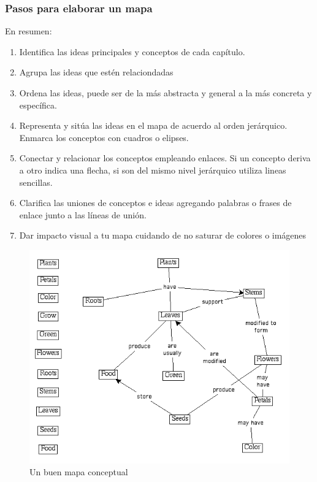 \documentclass[
	11pt, %
]{beamer}
\begin{document}
\begin{frame}
  \frametitle{Pasos para elaborar un mapa}

  En resumen:\\
  \begin{enumerate}
  \item Identifica las ideas principales y conceptos de cada capítulo.
  \item Agrupa las ideas que estén relaciondadas
  \item Ordena las ideas, puede ser de la más abstracta y general a la más concreta y específica.
  \item Representa y sitúa las ideas en el mapa de acuerdo al orden jerárquico. Enmarca los conceptos con cuadros o elipses.
  \item Conectar y relacionar los conceptos empleando enlaces. Si un concepto deriva a otro indica una flecha, si son del mismo nivel jerárquico utiliza lineas sencillas.
  \item Clarifica las uniones de conceptos e ideas agregando palabras o frases de enlace junto a las líneas de unión.
  \item Dar impacto visual a tu mapa cuidando de no saturar de colores o imágenes
  \end{enumerate}

\end{frame}

\begin{frame}
  \begin{figure}[h]
    \includegraphics[width=0.7\linewidth]{plants.png}
    \caption{Un buen mapa conceptual}
    \centering
  \end{figure}
\end{frame}
\end{document}
